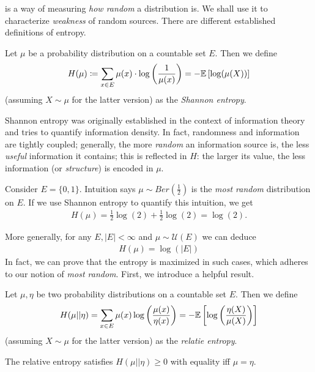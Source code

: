  is a way of measuring \emph{how random} a distribution is.
We shall use it to characterize \emph{weakness} of random sources.
There are different established definitions of entropy.
\begin{definition}
    Let $\mu$ be a probability distribution on a countable set $E$.
    Then we define
    \begin{align*}
        H(\mu) \coloneqq \sum_{x \in E}\mu(x) \cdot \log\left(\frac{1}{\mu(x)}\right)=-\mathbb{E}\left[\log(\mu(X))\right]
    \end{align*}
    (assuming $X \sim \mu$ for the latter version) as the \emph{Shannon entropy}.
\end{definition}
Shannon entropy was originally established in the context of information theory and
tries to quantify information density.
In fact, randomness and information are tightly coupled; generally, the more \emph{random}
an information source is, the less \emph{useful} information it contains;
this is reflected in $H$: the larger its value, the less information (or \emph{structure}) is encoded in $\mu$.
\begin{example}
    Consider $E=\{0,1\}$.
    Intuition says $\mu \sim Ber(\frac{1}{2})$ is the \emph{most random} distribution on $E$.
    If we use Shannon entropy to quantify this intuition, we get
    \begin{align*}
        H(\mu) = \frac{1}{2}\log(2) + \frac{1}{2}\log(2) = \log(2).
    \end{align*}
\end{example}
More generally, for any $E, |E| < \infty$ and $\mu \sim \mathcal U(E)$ we can deduce
\begin{align*}
    H(\mu) = \log(|E|)
\end{align*}
In fact, we can prove that the entropy is maximized in such cases, which adheres to our notion of \emph{most random}.
First, we introduce a helpful result.
\begin{definition}
    Let $\mu, \eta$ be two probability distributions on a countable set $E$.
    Then we define
    \begin{align*}
        H(\mu || \eta) = \sum_{x \in E}\mu(x)\log\left(\frac{\mu(x)}{\eta(x)}\right) = -\mathbb{E}\left[\log\left(\frac{\eta(X)}{\mu(X)}\right)\right]
    \end{align*}
    (assuming $X \sim \mu$ for the latter version) as the \emph{relatie entropy}.
\end{definition}
\begin{lemma}
    The relative entropy satisfies $H(\mu || \eta) \geq 0$ with equality iff $\mu = \eta$.
\end{lemma}
